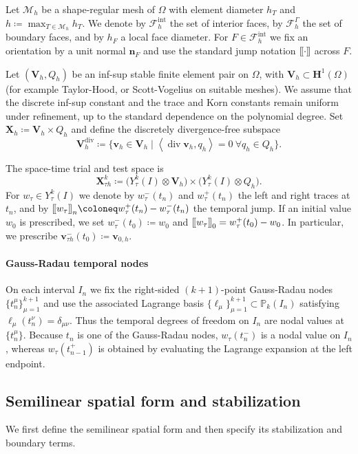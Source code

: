 \documentclass[DIV=16]{scrartcl}
\DeclareMathOperator{\divv}{div}
\newcommand{\Ip}[2]{\left\langle #1,#2\right\rangle}
\newcommand{\uu}{\boldsymbol v}
\newcommand{\nn}{\boldsymbol n}
\newcommand{\ljump}{\mathopen{[\mkern-2mu[}}
\newcommand{\rjump}{\mathclose{]\mkern-2mu]}}
\newcommand{\jump}[1]{\ljump #1 \rjump}
\newcommand{\It}{I}
\newcommand{\In}{I_n}
\newcommand{\Th}{\mathcal M_h}
\newcommand{\Fh}{\mathcal F_h}
\newcommand{\Fhi}{\mathcal F_h^{\mathrm{int}}}
\newcommand{\Pk}{\mathbb P_k}
\newcommand{\Vh}{\boldsymbol V_h}
\newcommand{\hF}{h_F}
\begin{document}
Let $\Th$ be a shape-regular mesh of $\Omega$ with element diameter $h_T$ and
$h\coloneq\max_{T\in\Th}h_T$.
We denote by $\Fhi$ the set of interior faces, by $\Fh^\Gamma$ the set of
boundary faces, and by $\hF$ a local face diameter.
For $F\in\Fhi$ we fix an orientation by a unit normal $\nn_F$ and use the
standard jump notation $\jump{\cdot}$ across $F$.

Let $(\Vh,Q_h)$ be an inf-sup stable finite element pair on $\Omega$, with
$\Vh\subset \boldsymbol H^1(\Omega)$ (for example Taylor-Hood, or
Scott-Vogelius on suitable meshes).
We assume that the discrete inf-sup constant and the trace and Korn constants
remain uniform under refinement, up to the standard dependence on the polynomial
degree.
Set $\boldsymbol X_h\coloneq \Vh\times Q_h$ and define the discretely
divergence-free subspace
\[
  \Vh^{\operatorname{div}}\coloneq
  \{\uu_h\in\Vh\mid \Ip{\divv\uu_h}{q_h}=0\ \forall q_h\in Q_h\}.
\]

The space-time trial and test space is
\[
  \boldsymbol X_{\tau h}^{k}
  \coloneq \big(Y_\tau^k(\It)\otimes \Vh\big)\times \big(Y_\tau^k(\It)\otimes Q_h\big).
\]
For $w_\tau\in Y_\tau^k(\It)$ we denote by $w_\tau^-(t_n)$ and $w_\tau^+(t_n)$
the left and right traces at $t_n$, and by
$\jump{w_\tau}_n\coloneq w_\tau^+(t_n)-w_\tau^-(t_n)$ the temporal jump.
If an initial value $w_0$ is prescribed, we set $w_\tau^-(t_0)\coloneq w_0$ and
$\jump{w_\tau}_0=w_\tau^+(t_0)-w_0$.
In particular, we prescribe $\uu_{\tau h}^-(t_0)\coloneq \uu_{0,h}$.

\paragraph{Gauss-Radau temporal nodes}
On each interval $\In$ we fix the right-sided $(k{+}1)$-point Gauss-Radau nodes
$\{t_n^\mu\}_{\mu=1}^{k+1}$ and use the associated Lagrange basis
$\{\ell_\mu\}_{\mu=1}^{k+1}\subset\Pk(\In)$ satisfying
$\ell_\mu(t_n^\nu)=\delta_{\mu\nu}$.
Thus the temporal degrees of freedom on $\In$ are nodal values at
$\{t_n^\mu\}$.
Because $t_n$ is one of the Gauss-Radau nodes, $w_\tau(t_n^-)$ is a nodal
value on $\In$, whereas $w_\tau(t_{n-1}^+)$ is obtained by evaluating the
Lagrange expansion at the left endpoint.

\subsection{Semilinear spatial form and stabilization}
\label{sec:st-forms}

We first define the semilinear spatial form and then specify its stabilization
and boundary terms.
\end{document}
